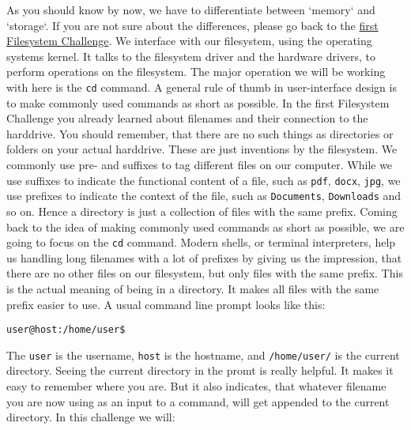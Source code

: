 \begin{challenge}
    \begin{chadescription}
    As you should know by now, we have to differentiate between `memory` and `storage`.
    If you are not sure about the differences, please go back to the \href{https://www.github.com/STEMgraph/}{first Filesystem Challenge}.
    We interface with our filesystem, using the operating systems kernel. 
    It talks to the filesystem driver and the hardware drivers, to perform operations on the filesystem.
    The major operation we will be working with here is the \texttt{cd} command.
    A general rule of thumb in user-interface design is to make commonly used commands as short as possible.
    In the first Filesystem Challenge you already learned about filenames and their connection to the harddrive. 
    You should remember, that there are no such things as directories or folders on your actual harddrive.
    These are just inventions by the filesystem. 
    We commonly use pre- and suffixes to tag different files on our computer. 
    While we use suffixes to indicate the functional content of a file, such as \texttt{pdf}, \texttt{docx}, \texttt{jpg}, we use prefixes to indicate the context of the file, such as \texttt{Documents}, \texttt{Downloads} and so on.
    Hence a directory is just a collection of files with the same prefix.
    Coming back to the idea of making commonly used commands as short as possible, we are going to focus on the \texttt{cd} command.
    Modern shells, or terminal interpreters, help us handling long filenames with a lot of prefixes by giving us the impression, that there are no other files on our filesystem, but only files with the same prefix.
    This is the actual meaning of being in a directory.
    It makes all files with the same prefix easier to use. 
    A usual command line prompt looks like this:
    \begin{center}
    \texttt{user@host:/home/user\$}
    \end{center}
    The \texttt{user} is the username, \texttt{host} is the hostname, and \texttt{/home/user/} is the current directory.
    Seeing the current directory in the promt is really helpful. 
    It makes it easy to remember where you are.
    But it also indicates, that whatever filename you are now using as an input to a command, will get appended to the current directory.
    In this challenge we will: 
    

\end{chadescription}
\end{challenge}
